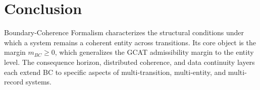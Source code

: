 \documentclass[letterpaper,10pt,conference]{ieeeconf}
\begin{document}
\section{Conclusion}

Boundary-Coherence Formalism characterizes the structural conditions under which a system remains a coherent entity across transitions. Its core object is the margin $m_{BC} \ge 0$, which generalizes the GCAT admissibility margin to the entity level. The consequence horizon, distributed coherence, and data continuity layers each extend BC to specific aspects of multi-transition, multi-entity, and multi-record systems.
\end{document}
